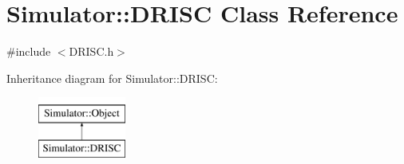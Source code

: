 \hypertarget{class_simulator_1_1_d_r_i_s_c}{\section{Simulator\+:\+:D\+R\+I\+S\+C Class Reference}
\label{class_simulator_1_1_d_r_i_s_c}
}


{\ttfamily \#include $<$D\+R\+I\+S\+C.\+h$>$}

Inheritance diagram for Simulator\+:\+:D\+R\+I\+S\+C\+:\begin{figure}[H]
\begin{center}
\leavevmode
\includegraphics[height=2.000000cm]{class_simulator_1_1_d_r_i_s_c}
\end{center}
\end{figure}
